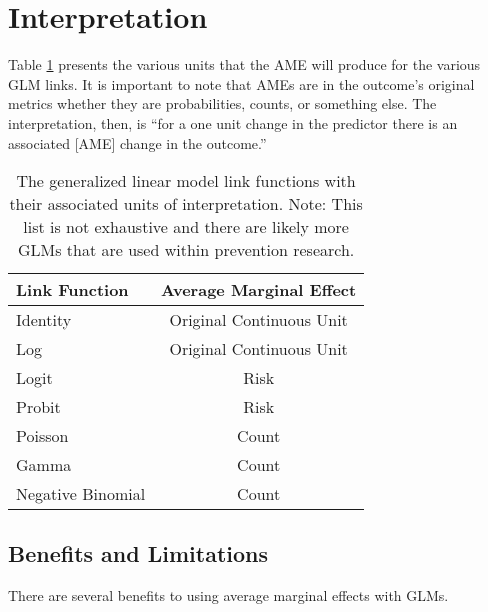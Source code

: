 \documentclass[]{DissertateUSU}
\begin{document}
\section{Interpretation}\label{interpretation-1}

Table \ref{tab_int} presents the various units that the AME will produce
for the various GLM links. It is important to note that AMEs are in the
outcome's original metrics whether they are probabilities, counts, or
something else. The interpretation, then, is ``for a one unit change in
the predictor there is an associated {[}AME{]} change in the outcome.''

\begin{table}[tb]
\centering
\caption{The generalized linear model link functions with their associated units of interpretation. Note: This list is not exhaustive and there are likely more GLMs that are used within prevention research.} 
\label{tab_int}
\begin{tabular}{lc}
\toprule
Link Function & Average Marginal Effect \\ 
\midrule
Identity & Original Continuous Unit \\ 
  Log & Original Continuous Unit \\ 
  Logit & Risk \\ 
  Probit & Risk \\ 
  Poisson & Count \\ 
  Gamma & Count \\ 
  Negative Binomial & Count \\ 
\bottomrule
\end{tabular}
\end{table}

\subsection{Benefits and Limitations}\label{benefits-and-limitations}

There are several benefits to using average marginal effects with GLMs.
\end{document}
